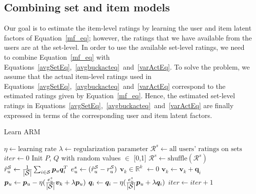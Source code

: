 \subsection{Combining set and item models}


Our goal is to estimate the item-level ratings by learning the user and item
latent factors of Equation~\ref{mf_eq}; however, the ratings that we have available
from the users are at the set-level. In order to use the available set-level
ratings, we need to combine 
Equation~\ref{mf_eq} with
Equations~\ref{avgSetEq},~\ref{avgbuckacteq}~and~\ref{varActEq}. To solve the problem, we assume that the actual
item-level ratings used in Equations~\ref{avgSetEq},~\ref{avgbuckacteq}~and~\ref{varActEq} correspond to the estimated ratings
given by Equation~\ref{mf_eq}. Hence, the estimated set-level ratings in
Equations~\ref{avgSetEq},~\ref{avgbuckacteq}~and~\ref{varActEq}
are finally expressed in terms of the corresponding user and item latent
factors.

\begin{algorithm}
  \caption{Learn ARM}
  \label{alg:alg-lfs-arm}
  \begin{algorithmic}[1]
    \State $\eta \gets  \text{learning rate}$
    \State $\lambda \gets \text{regularization parameter}$
    \State $\mathcal{R}^s \gets \text{all users' ratings on sets}$  
    \State $iter \gets 0$
    \State Init $P$, $Q$ with random values $\in$ [0,1] 
      \State $\mathcal{R}^s \gets \text{shuffle}(\mathcal{R}^s)$
        \State $\mbox{$\hat{r}_{u}^{\mathcal{S}}$} \gets  \frac{1}{\mbox{$|\mathcal{S}|$}} \sum_{\substack{i
        \in \mathcal{S}}} \bm{p}_u\bm{q}_i^T$ 
        \State $e_{u}^s \gets (\mbox{$\hat{r}_{u}^{\mathcal{S}}$} - \mbox{$r_{u}^{\mathcal{S}}$})$
        \State $\bm{v}_k \in \mathbb{R}^k$  $\gets 0$
        \State $\bm{v}_k \gets \bm{v}_k + \bm{q}_i$
        \EndFor
        \State $\bm{p}_u \gets \bm{p}_u - \eta(\frac{e_{u}^s}{\mbox{$|\mathcal{S}|$}} \bm{v}_k +
        \lambda \bm{p}_u)$ 
          \State $\bm{q}_i \gets \bm{q}_i - \eta(\frac{e_{u}^s}{\mbox{$|\mathcal{S}|$}} \bm{p}_u +
            \lambda \bm{q}_i)$  
        \EndFor
      \EndFor
      \State $iter \gets iter + 1$
    \EndWhile
    \EndProcedure
  \end{algorithmic}
\end{algorithm}

